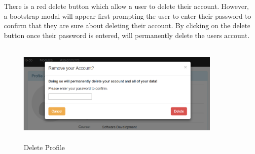 There is a red delete button which allow a user to delete their account. However, a bootstrap modal will appear first prompting the user to enter their password to confirm that they are sure about deleting their account. By clicking on the delete button once their password is entered, will permanently delete the users account.

\begin{figure}[h]
\centering
\includegraphics[width=10cm, height=5cm]{img/ProfileDelete}
\caption{Delete Profile}
\label{fig:ProfileDelete}
\end{figure}

